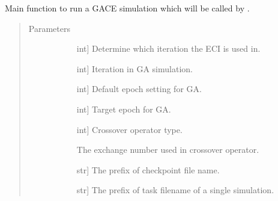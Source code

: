 \documentclass[letterpaper,10pt,english]{sphinxmanual}
\begin{document}
\begin{fulllineitems}
\begin{fulllineitems}
\begin{quote}
\begin{description}
\begin{description}
\end{description}

\end{description}\end{quote}

\end{fulllineitems}


\begin{fulllineitems}
\label{\detokenize{pygace:pygace.general_gace.GeneralApp.run}}
Main function to run a GACE simulation which will be called by
.
\begin{quote}\begin{description}
\item[{Parameters}] \leavevmode\begin{description}
\item[{}] \leavevmode{[}int{]}
Determine which iteration the ECI is used in.

\item[{}] \leavevmode{[}int{]}
Iteration in GA simulation.

\item[{}] \leavevmode{[}int{]}
Default epoch setting for GA.

\item[{}] \leavevmode{[}int{]}
Target epoch for GA.

\item[{}] \leavevmode{[}int{]}
Crossover operator type.

\item[{}] \leavevmode
The exchange number used in crossover operator.

\item[{}] \leavevmode{[}str{]}
The prefix of checkpoint file name.

\item[{}] \leavevmode{[}str{]}
The prefix of task filename of a single simulation.


\end{description}
\end{description}
\end{quote}
\end{fulllineitems}
\end{fulllineitems}
\end{document}
